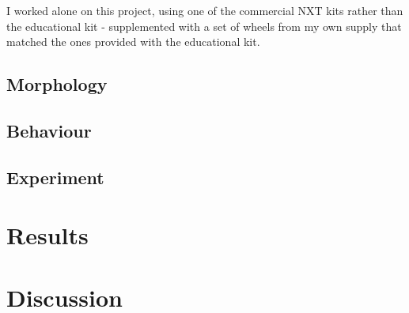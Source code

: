 \documentclass[a4paper,12pt]{article}
\begin{document}
I worked alone on this project, using one of the commercial NXT kits rather than the educational kit - supplemented with a set of wheels from my own supply that matched the ones provided with the educational kit.

\subsection{Morphology}

\subsection{Behaviour}
\citet{BrooksAIJ91}

\subsection{Experiment}


\section{Results}


\section{Discussion}

\end{document}
